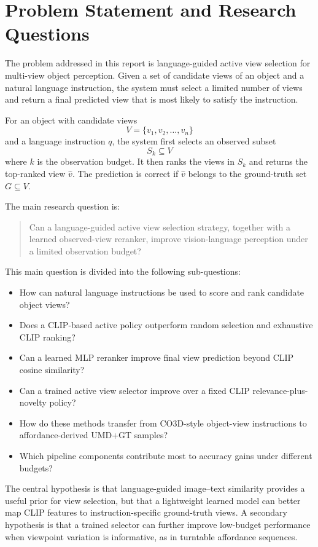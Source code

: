 \section{Problem Statement and Research Questions}

The problem addressed in this report is language-guided active view selection for multi-view object perception. Given a set of candidate views of an object and a natural language instruction, the system must select a limited number of views and return a final predicted view that is most likely to satisfy the instruction.

For an object with candidate views
\[
V = \{v_1, v_2, \ldots, v_n\}
\]
and a language instruction \(q\), the system first selects an observed subset
\[
S_k \subseteq V
\]
where \(k\) is the observation budget. It then ranks the views in \(S_k\) and returns the top-ranked view \(\hat{v}\). The prediction is correct if \(\hat{v}\) belongs to the ground-truth set \(G \subseteq V\).

The main research question is:

\begin{quote}
Can a language-guided active view selection strategy, together with a learned observed-view reranker, improve vision-language perception under a limited observation budget?
\end{quote}

This main question is divided into the following sub-questions:

\begin{itemize}
    \item How can natural language instructions be used to score and rank candidate object views?
    \item Does a CLIP-based active policy outperform random selection and exhaustive CLIP ranking?
    \item Can a learned MLP reranker improve final view prediction beyond CLIP cosine similarity?
    \item Can a trained active view selector improve over a fixed CLIP relevance-plus-novelty policy?
    \item How do these methods transfer from CO3D-style object-view instructions to affordance-derived UMD+GT samples?
    \item Which pipeline components contribute most to accuracy gains under different budgets?
\end{itemize}

The central hypothesis is that language-guided image--text similarity provides a useful prior for view selection, but that a lightweight learned model can better map CLIP features to instruction-specific ground-truth views. A secondary hypothesis is that a trained selector can further improve low-budget performance when viewpoint variation is informative, as in turntable affordance sequences.

